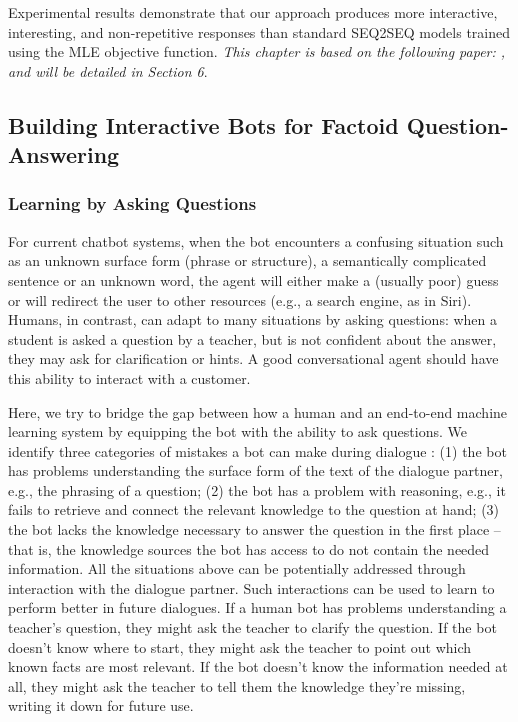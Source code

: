 Experimental results demonstrate that our approach
produces more interactive, interesting, and
non-repetitive responses than standard SEQ2SEQ
models trained using the MLE objective function.
  {\it This chapter is based on the following paper: , and will be detailed in Section 6}. 
\subsection{Building Interactive Bots for Factoid Question-Answering}

  \subsubsection*{Learning by  Asking Questions}
  For current chatbot systems, when the bot encounters a confusing situation such as an unknown surface form (phrase
or structure), a semantically complicated sentence or an unknown word, the agent will either make
a (usually poor) guess or will redirect the user to other resources (e.g., a search engine, as in Siri).
Humans, in contrast, can adapt to many situations by asking questions: when a student is asked a question by a teacher, but is not confident about the answer, they may ask
for clarification or hints. A good conversational agent should have this ability
to interact with a customer. 

Here, we try to bridge the gap between how a human and an end-to-end machine learning system by equipping the bot with the ability to ask questions.
We identify three categories of mistakes a bot can make during dialogue
: (1) the bot has
problems understanding the surface form of the text of the dialogue partner, e.g., the phrasing of
a question; (2) the bot has a problem with reasoning, e.g., it fails to retrieve and connect the
relevant knowledge to the question at hand; (3) the bot lacks the knowledge necessary to answer
the question in the first place -- that is, the knowledge sources the bot has access to do not contain
the needed information.
All the situations above can be potentially addressed through interaction with the dialogue partner.
Such interactions can be used to learn to perform better in future dialogues. If a human bot has
problems understanding a teacher's question, they might ask the teacher to clarify the question. If
the bot doesn't know where to start, they might ask the teacher to point out which known facts
are most relevant. If the bot doesn't know the information needed at all, they might ask the
teacher to tell them the knowledge they're missing, writing it down for future use.

